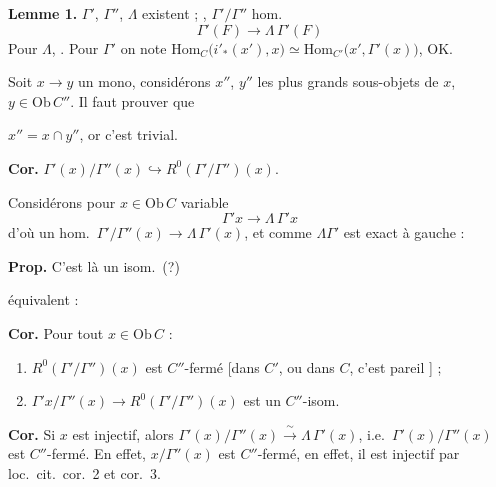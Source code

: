 \documentclass[11pt,a4paper]{article}
\begin{document}
\textbf{Lemme 1.} $\Gamma'$, $\Gamma''$, $\Lambda$ existent ; \ill{},
$\Gamma'/\Gamma''$ hom.\ \ill{}
\[
  \Gamma'(F) \longrightarrow \Lambda\,\Gamma'(F)
\]
\ill{} Pour $\Lambda$, \ill{}. Pour $\Gamma'$ on note \ill{}
$\mathrm{Hom}_{C}\bigl( i'_{*}(x'), x \bigr) \simeq
 \mathrm{Hom}_{C'}\bigl( x', \Gamma'(x) \bigr)$, OK.

Soit $x \to y$ un mono, considérons $x''$, $y''$ les plus grands sous-objets
de $x$, $y \in \mathrm{Ob}\, C''$. Il faut prouver que


$x'' = x \cap y''$, or c'est trivial.

\textbf{Cor.} $\Gamma'(x)/\Gamma''(x) \hookrightarrow
R^{0}(\Gamma'/\Gamma'')(x)$.

Considérons pour $x \in \mathrm{Ob}\, C$ variable
\[
  \Gamma'x \longrightarrow \Lambda\,\Gamma'x
\]
d'où un hom.\ $\Gamma'/\Gamma''(x) \longrightarrow \Lambda\,\Gamma'(x)$, et
comme $\Lambda\Gamma'$ est exact à gauche :


\textbf{Prop.} C'est là un isom.\ (?)

équivalent :

\textbf{Cor.} Pour tout $x \in \mathrm{Ob}\, C$ :
\begin{enumerate}
\item[a)] $R^{0}(\Gamma'/\Gamma'')(x)$ est $C''$-fermé [dans $C'$, ou dans
      $C$, c'est pareil \ill{}] ;
\item[b)] $\Gamma'x/\Gamma''(x) \to R^{0}(\Gamma'/\Gamma'')(x)$ est un
      $C''$-isom.
\end{enumerate}
\ill{}

\textbf{Cor.} Si $x$ est injectif, alors
$\Gamma'(x)/\Gamma''(x) \xrightarrow{\ \sim\ } \Lambda\,\Gamma'(x)$, i.e.\
$\Gamma'(x)/\Gamma''(x)$ est \struck{\ill{}} $C''$-fermé. En effet,
$x/\Gamma''(x)$ est $C''$-fermé, \struck{et} en effet, il est injectif par
loc.\ cit.\ cor.\ 2 et cor.\ 3.
\end{document}
